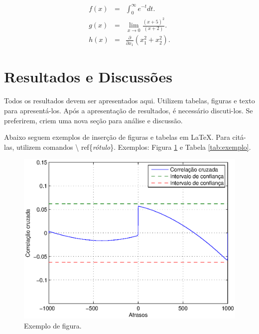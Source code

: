 \documentclass[12pt,titlepage]{article}
\begin{document}
\begin{eqnarray}
f(x) &=& \int_{0}^{\infty} e^{-t}dt. \\
g(x) &=& \lim_{x \to 0} \frac{(x+5)^2}{(x+2)}. \\
h(x) &=& \frac{ \partial }{\partial x_1} (x_1^2 + x_2^2).
\end{eqnarray}



\section{Resultados e Discussões}
\label{sec:resul}

Todos os resultados devem ser apresentados aqui. Utilizem tabelas, figuras e 
texto para apresentá-los. Após a apresentação de resultados, é necessário 
discuti-los. Se preferirem, criem uma nova seção para análise e discussão.

Abaixo seguem exemplos de inserção de figuras e tabelas em \LaTeX. Para 
citá-las, utilizem comandos \textbackslash \! 
ref\{\textit{rótulo}\}. Exemplos: Figura \ref{fig:exemplo} 
e Tabela \ref{tab:exemplo}.

\begin{figure}[!hb]
  \begin{center}
    \includegraphics[scale=0.7,angle=0]{cor.eps}
  \end{center}
  \caption{Exemplo de figura.}
  \label{fig:exemplo}
\end{figure}
\end{document}
